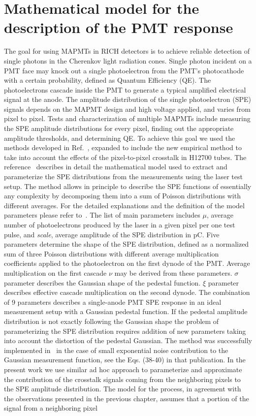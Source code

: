 \section{Mathematical model for the description of the PMT response}

The goal for using MAPMTs in RICH detectors is to achieve reliable detection of single photons in the Cherenkov light radiation cones. Single photon incident on a PMT face may knock out a single photoelectron from the PMT's photocathode with a certain probability, defined as Quantum Efficiency (QE). The photoelectrons cascade inside the PMT to generate a typical amplified electrical signal at the anode. The amplitude distribution of the single photoelectron (SPE) signals depends on the MAPMT design and high voltage applied, and varies from pixel to pixel. Tests and characterization of multiple MAPMTs include measuring the SPE amplitude distributions for every pixel, finding out the appropriate amplitude thresholds, and determining QE. To achieve this goal we used the methods developed in Ref.~\cite{DEGTIARENKO20171}, expanded to include the new empirical method to take into account the effects of the pixel-to-pixel crosstalk in H12700 tubes. The reference~\cite{DEGTIARENKO20171} describes in detail the mathematical model used to extract and parameterize the SPE distributions from the measurements using the laser test setup. The method allows in principle to describe the SPE functions of essentially any complexity by decomposing them into a sum of Poisson distributions with different averages. For the detailed explanations and the definition of the model parameters please refer to~\cite{DEGTIARENKO20171}. The list of main parameters includes $\mu$, average number of photoelectrons produced by the laser in a given pixel per one test pulse, and {\it{scale}}, average amplitude of the SPE distribution in pC. Five parameters determine the shape of the SPE distribution, defined as a normalized sum of three Poisson distributions with different average multiplication coefficients applied to the photoelectron on the first dynode of the PMT. Average multiplication on the first cascade ${\nu}$ may be derived from these parameters. ${\sigma}$ parameter describes the Gaussian shape of the pedestal function. ${\xi}$ parameter describes effective cascade multiplication on the second dynode. The combination of 9 parameters describes a single-anode PMT SPE response in an ideal measurement setup with a Gaussian pedestal function. If the pedestal amplitude distribution is not exactly following the Gaussian shape the problem of parameterizing the SPE distribution requires addition of new parameters taking into account the distortion of the pedestal Gaussian. The method was successfully implemented in~\cite{DEGTIARENKO20171} in the case of small exponential noise contribution to the Gaussian measurement function, see the Eqs. (38-40) in that publication. In the present work we use similar ad hoc approach to parameterize and approximate the contribution of the crosstalk signals coming from the neighboring pixels to the SPE amplitude distribution. The model for the process, in agreement with the observations presented in the previous chapter, assumes that a portion of the signal from a neighboring pixel 